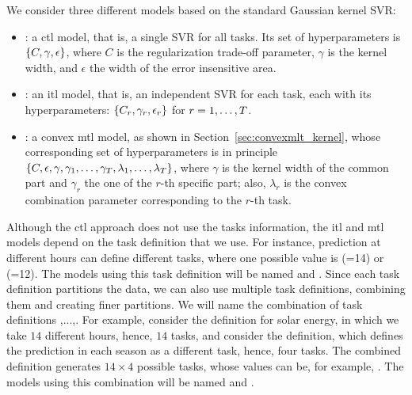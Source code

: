 %
We consider three different models based on the standard Gaussian kernel SVR:
\begin{itemize}
    \item {}: a \acrshort{ctl} model, that is, a single SVR for all tasks. Its set of hyperparameters is $\left\{C, \gamma, \epsilon\right\}$, where $C$ is the regularization trade-off parameter, $\gamma$ is the kernel width, and $\epsilon$ the width of the error insensitive area.
    \item {}: an \acrshort{itl} model, that is, an independent SVR for each task, each with its hyperparameters: $\left\{C_r, \gamma_r, \epsilon_r\right\}$ for $r=1, \ldots, T$.
    \item {}: a convex \acrshort{mtl} model, as shown in Section~\ref{sec:convexmlt_kernel}, whose corresponding set of hyperparameters is in principle $\left\{C, \epsilon, \gamma, \gamma_1, \ldots, \gamma_T, \lambda_1, \ldots, \lambda_T\right\}$, where $\gamma$ is the kernel width of the common part and $\gamma_r$ the one of the $r$-th specific part; also, $\lambda_r$ is the convex combination parameter corresponding to the $r$-th task.
\end{itemize}
%
Although the \acrshort{ctl} approach does not use the tasks information, the \acrshort{itl} and \acrshort{mtl} models depend on the task definition that we use. For instance, prediction at different hours can define different tasks, where one possible value is (=14) or (=12). The models using this task definition will be named  and . 
%
Since each task definition partitions the data, we can also use multiple task definitions, combining them and creating finer partitions. 
We will name  the combination of task definitions ,...,. For example, consider the  definition for solar energy, in which we take $14$ different hours, hence, $14$ tasks, and consider the  definition, which defines the prediction in each season as a different task, hence, four tasks. The combined definition  generates $14 \times 4$ possible tasks, whose values can be, for example, .
The models using this combination will be named  and .

